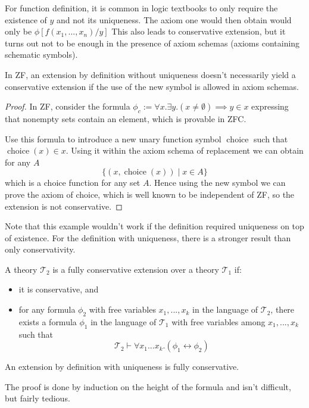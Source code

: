 For function definition, it is common in logic textbooks to only require the existence of $y$ and not its uniqueness. The axiom one would then obtain would only be $\phi[f(x_1,...,x_n)/y]$ This also leads to conservative extension, but it turns out not to be enough in the presence of axiom schemas (axioms containing schematic symbols).
\begin{lemma}

	In ZF, an extension by definition without uniqueness doesn't necessarily yield a conservative extension if the use of the new symbol is allowed in axiom schemas.

\end{lemma}
\begin{proof}
	In ZF, consider the formula $\phi_c := \forall x. \exists y. (x \neq \emptyset) \implies y \in x$ expressing that nonempty sets contain an element, which is provable in ZFC.

	Use this formula to introduce a new unary function symbol $\operatorname{choice}$ such that $\operatorname{choice}(x) \in x$. Using it within the axiom schema of replacement we can obtain for any $A$
	$$
		\lbrace (x, \operatorname{choice}(x)) \mid x \in A \rbrace
	$$
	which is a choice function for any set $A$. Hence using the new symbol we can prove the axiom of choice, which is well known to be independent of ZF, so the extension is not conservative.
\end{proof}
Note that this example wouldn't work if the definition required uniqueness on top of existence.
For the definition with uniqueness, there is a stronger result than only conservativity.
\begin{defin}
	A theory $\mathcal{T}_2$ is a fully conservative extension over a theory $\mathcal{T}_1$ if:
	\begin{itemize}

		\item it is conservative, and
		\item for any formula $\phi_2$ with free variables $x_1, ..., x_k$ in the language of $\mathcal{T}_2$, there exists a formula $\phi_1$ in the language of $\mathcal{T}_1$ with free variables among $x_1, ..., x_k$ such that
		      $$\mathcal{T}_2 \vdash \forall x_1...x_k. (\phi_1 \leftrightarrow \phi_2)$$
	\end{itemize}
\end{defin}
\begin{thm}
	An extension by definition with uniqueness is fully conservative.
\end{thm}
The proof is done by induction on the height of the formula and isn't difficult, but fairly tedious.
